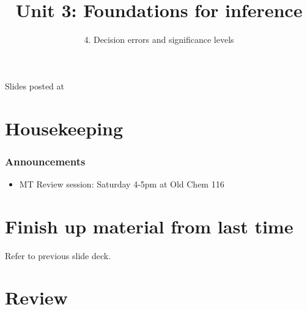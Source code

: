 \documentclass[11pt,containsverbatim,handout,xcolor=xelatex,dvipsnames,table]{beamer}
\title{Unit 3: Foundations for inference}
\subtitle{4. Decision errors and significance levels}
\author{\CourseName}
\date{}
\institute{\InstituteName}
\begin{document}



\begin{frame}[plain]

\titlepage

\vfill

{\scriptsize {} \hfill Slides posted at  \webURL{\CourseSite}}

\addtocounter{framenumber}{-1} 

\end{frame}


\section{Housekeeping}


\begin{frame}
\frametitle{Announcements}

\begin{itemize}

\item MT Review session: Saturday 4-5pm at Old Chem 116

\end{itemize}

\end{frame}


\section{Finish up material from last time}


\begin{frame}

\vfill

Refer to previous slide deck.

\vfill

\end{frame}


\section{Review}
\end{document}
